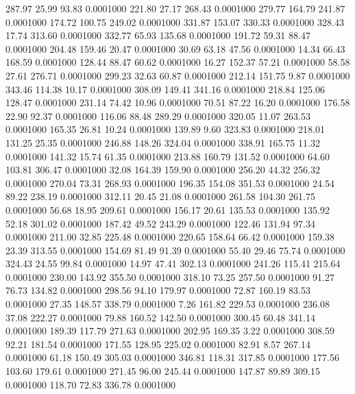  287.97   25.99   93.83   0.0001000
 221.80   27.17  268.43   0.0001000
 279.77  164.79  241.87   0.0001000
 174.72  100.75  249.02   0.0001000
 331.87  153.07  330.33   0.0001000
 328.43   17.74  313.60   0.0001000
 332.77   65.93  135.68   0.0001000
 191.72   59.31   88.47   0.0001000
 204.48  159.46   20.47   0.0001000
  30.69   63.18   47.56   0.0001000
  14.34   66.43  168.59   0.0001000
 128.44   88.47   60.62   0.0001000
  16.27  152.37   57.21   0.0001000
  58.58   27.61  276.71   0.0001000
 299.23   32.63   60.87   0.0001000
 212.14  151.75    9.87   0.0001000
 343.46  114.38   10.17   0.0001000
 308.09  149.41  341.16   0.0001000
 218.84  125.06  128.47   0.0001000
 231.14   74.42   10.96   0.0001000
  70.51   87.22   16.20   0.0001000
 176.58   22.90   92.37   0.0001000
 116.06   88.48  289.29   0.0001000
 320.05   11.07  263.53   0.0001000
 165.35   26.81   10.24   0.0001000
 139.89    9.60  323.83   0.0001000
 218.01  131.25   25.35   0.0001000
 246.88  148.26  324.04   0.0001000
 338.91  165.75   11.32   0.0001000
 141.32   15.74   61.35   0.0001000
 213.88  160.79  131.52   0.0001000
  64.60  103.81  306.47   0.0001000
  32.08  164.39  159.90   0.0001000
 256.20   44.32  256.32   0.0001000
 270.04   73.31  268.93   0.0001000
 196.35  154.08  351.53   0.0001000
  24.54   89.22  238.19   0.0001000
 312.11   20.45   21.08   0.0001000
 261.58  104.30  261.75   0.0001000
  56.68   18.95  209.61   0.0001000
 156.17   20.61  135.53   0.0001000
 135.92   52.18  301.02   0.0001000
 187.42   49.52  243.29   0.0001000
 122.46  131.94   97.34   0.0001000
 211.00   32.85  225.48   0.0001000
 220.65  158.64   66.42   0.0001000
 159.38   23.39  313.55   0.0001000
 154.69   81.49   91.39   0.0001000
  55.40   29.46   75.74   0.0001000
 324.43   24.55   99.84   0.0001000
  14.97   47.41  302.13   0.0001000
 241.26  115.41  215.64   0.0001000
 230.00  143.92  355.50   0.0001000
 318.10   73.25  257.50   0.0001000
  91.27   76.73  134.82   0.0001000
 298.56   94.10  179.97   0.0001000
  72.87  160.19   83.53   0.0001000
  27.35  148.57  338.79   0.0001000
   7.26  161.82  229.53   0.0001000
 236.08   37.08  222.27   0.0001000
  79.88  160.52  142.50   0.0001000
 300.45   60.48  341.14   0.0001000
 189.39  117.79  271.63   0.0001000
 202.95  169.35    3.22   0.0001000
 308.59   92.21  181.54   0.0001000
 171.55  128.95  225.02   0.0001000
  82.91    8.57  267.14   0.0001000
  61.18  150.49  305.03   0.0001000
 346.81  118.31  317.85   0.0001000
 177.56  103.60  179.61   0.0001000
 271.45   96.00  245.44   0.0001000
 147.87   89.89  309.15   0.0001000
 118.70   72.83  336.78   0.0001000
